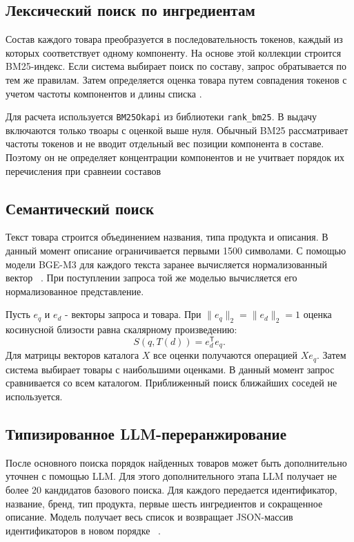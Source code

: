 \documentclass{misisarticle}
\begin{document}
\subsection{Лексический поиск по ингредиентам}

Состав каждого товара преобразуется в последовательность токенов, каждый из которых соответствует одному компоненту. На основе этой коллекции строится BM25-индекс. Если система выбирает поиск по составу, запрос обратывается по тем же правилам. Затем определяется оценка товара путем совпадения токенов с учетом частоты компонентов и длины списка \cite{robertson2009}.

Для расчета используется \texttt{BM25Okapi} из библиотеки \texttt{rank\_bm25}. В выдачу включаются только твоары с оценкой выше нуля. Обычный BM25 рассматривает частоты токенов и не вводит отдельный вес позиции компонента в составе. Поэтому он не определяет концентрации компонентов и не учитвает порядок их перечисления при сравнеии составов

\subsection{Семантический поиск}

Текст товара строится объединением названия, типа продукта и описания. В данный момент описание ограничивается первыми 1500 символами. С помощью модели BGE-M3 для каждого текста заранее вычисляется нормализованный вектор ~\cite{chen2024}. При поступлении запроса той же моделью вычисляется его нормализованное представление.

Пусть $e_q$ и $e_d$ - векторы запроса и товара. При $\|e_q\|_2=\|e_d\|_2=1$ оценка косинусной близости равна скалярному произведению:
\begin{equation}
S(q,T(d))=e_d^{\mathsf T}e_q.
\label{eq:cos}
\end{equation}
Для матрицы векторов каталога $X$ все оценки получаются операцией $Xe_q$. Затем система выбирает товары с наибольшими оценками. В данный момент запрос сравнивается со всем каталогом. Приближенный поиск ближайших соседей не используется.

\subsection{Типизированное LLM-переранжирование}

После основного поиска порядок найденных товаров может быть дополнительно уточнен с помощью LLM. Для этого дополнительного этапа LLM получает не более 20 кандидатов базового поиска. Для каждого передается идентификатор, название, бренд, тип продукта, первые шесть ингредиентов и сокращенное описание. Модель получает весь список и возвращает JSON-массив идентификаторов в новом порядке ~\cite{sun2023}.
\end{document}
